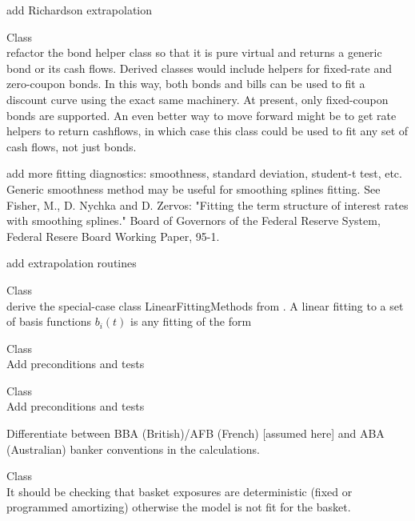 \begin{DoxyRefList}
\label{todo__todo000056}%
%
add Richardson extrapolation 
\item[Class \doxylink{class_quant_lib_1_1_fitted_bond_discount_curve}{Quant\+Lib\+::Fitted\+Bond\+Discount\+Curve} ]\hfill \\
\label{todo__todo000072}%
%
refactor the bond helper class so that it is pure virtual and returns a generic bond or its cash flows. Derived classes would include helpers for fixed-\/rate and zero-\/coupon bonds. In this way, both bonds and bills can be used to fit a discount curve using the exact same machinery. At present, only fixed-\/coupon bonds are supported. An even better way to move forward might be to get rate helpers to return cashflows, in which case this class could be used to fit any set of cash flows, not just bonds.

\label{todo__todo000073}%
%
add more fitting diagnostics\+: smoothness, standard deviation, student-\/t test, etc. Generic smoothness method may be useful for smoothing splines fitting. See Fisher, M., D. Nychka and D. Zervos\+: "{}\+Fitting the term       structure of interest rates with smoothing splines."{} Board of Governors of the Federal Reserve System, Federal Resere Board Working Paper, 95-\/1.

\label{todo__todo000074}%
%
add extrapolation routines 
\item[Class \doxylink{class_quant_lib_1_1_fitted_bond_discount_curve_1_1_fitting_method}{Quant\+Lib\+::Fitted\+Bond\+Discount\+Curve\+::Fitting\+Method} ]\hfill \\
\label{todo__todo000075}%
%
derive the special-\/case class Linear\+Fitting\+Methods from . A linear fitting to a set of basis functions $ b_i(t) $ is any fitting of the form  
\item[Class \doxylink{class_quant_lib_1_1_forward}{Quant\+Lib\+::Forward} ]\hfill \\
\label{todo__todo000041}%
%
Add preconditions and tests 
\item[Class \doxylink{class_quant_lib_1_1_forward_rate_agreement}{Quant\+Lib\+::Forward\+Rate\+Agreement} ]\hfill \\
\label{todo__todo000042}%
%
Add preconditions and tests

\label{todo__todo000043}%
%
Differentiate between BBA (British)/\+AFB (French) \mbox{[}assumed here\mbox{]} and ABA (Australian) banker conventions in the calculations. 
\item[Class \doxylink{class_quant_lib_1_1_gaussian_l_h_p_loss_model}{Quant\+Lib\+::Gaussian\+LHPLoss\+Model} ]\hfill \\
\label{todo__todo000013}%
%
It should be checking that basket exposures are deterministic (fixed or programmed amortizing) otherwise the model is not fit for the basket.


\end{DoxyRefList}

